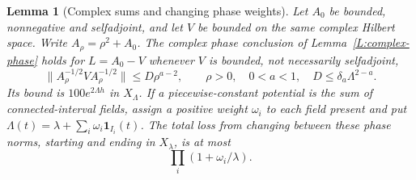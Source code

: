 \documentclass[12pt,oneside,openany]{book}
\makeatletter
\let\lean@pending\@empty
\newcommand{\LeanMarker}[1]{\gdef\lean@pending{#1}}
\numberwithin{equation}{section}
\newtheorem{lemma}[theorem]{Lemma}
\theoremstyle{nogostyle}
\theoremstyle{definition}
\makeatother
\begin{document}
\LeanMarker{L:interval-complex}
\begin{lemma}[Complex sums and changing phase weights]
  \label{L:interval-complex}
  Let $A_0$ be bounded, nonnegative and selfadjoint, and let $V$ be bounded on
  the same complex Hilbert space. Write $A_\rho = \rho^2+A_0$. The complex phase
  conclusion of Lemma~\ref{L:complex-phase} holds for $L = A_0-V$ whenever $V$
  is bounded, not necessarily selfadjoint,
  \[
    \|A_\rho^{-1/2}VA_\rho^{-1/2}\|\le D\rho^{a-2},\qquad \rho>0,
    \quad 0<a<1,\quad D\le\delta_a\Lambda^{2-a}.
  \]
  Its bound is $100e^{2\Lambda h}$ in $X_\Lambda$. If a piecewise-constant
  potential is the sum of connected-interval fields, assign a positive weight
  $\omega_i$ to each field present and put $\Lambda(t) =
  \lambda+\sum_i\omega_i\mathbf1_{I_i}(t)$. The total loss from changing between
  these phase norms, starting and ending in $X_\lambda$, is at most
  \begin{equation}\label{E:interval-metric}
    \prod_i(1+\omega_i/\lambda).
  \end{equation}
\end{lemma}
\end{document}
